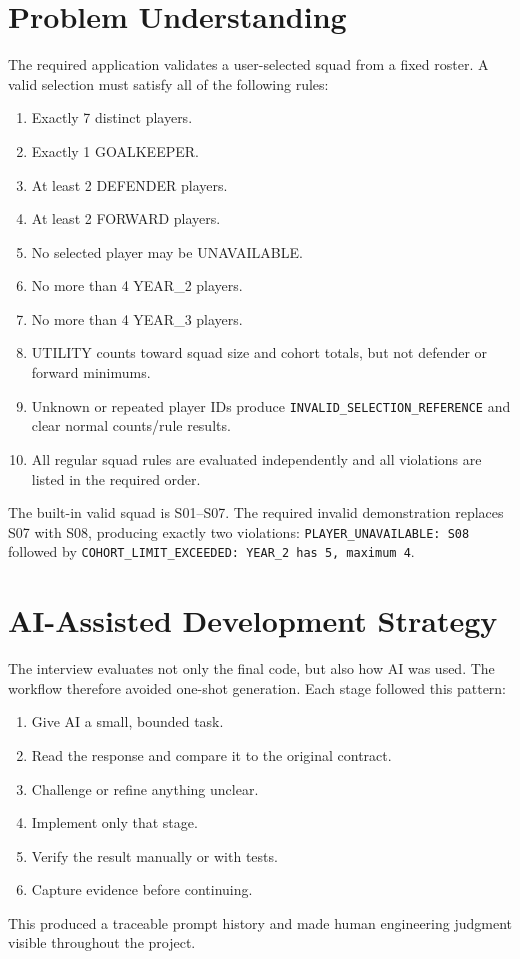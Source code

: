 \documentclass[11pt,a4paper]{article}
\begin{document}
\section{Problem Understanding}
The required application validates a user-selected squad from a fixed roster. A valid selection must satisfy all of the following rules:
\begin{enumerate}
\item Exactly 7 distinct players.
\item Exactly 1 GOALKEEPER.
\item At least 2 DEFENDER players.
\item At least 2 FORWARD players.
\item No selected player may be UNAVAILABLE.
\item No more than 4 YEAR\_2 players.
\item No more than 4 YEAR\_3 players.
\item UTILITY counts toward squad size and cohort totals, but not defender or forward minimums.
\item Unknown or repeated player IDs produce \texttt{INVALID\_SELECTION\_REFERENCE} and clear normal counts/rule results.
\item All regular squad rules are evaluated independently and all violations are listed in the required order.
\end{enumerate}

The built-in valid squad is S01--S07. The required invalid demonstration replaces S07 with S08, producing exactly two violations: \texttt{PLAYER\_UNAVAILABLE: S08} followed by \texttt{COHORT\_LIMIT\_EXCEEDED: YEAR\_2 has 5, maximum 4}.

\section{AI-Assisted Development Strategy}
The interview evaluates not only the final code, but also how AI was used. The workflow therefore avoided one-shot generation. Each stage followed this pattern:
\begin{enumerate}
\item Give AI a small, bounded task.
\item Read the response and compare it to the original contract.
\item Challenge or refine anything unclear.
\item Implement only that stage.
\item Verify the result manually or with tests.
\item Capture evidence before continuing.
\end{enumerate}
This produced a traceable prompt history and made human engineering judgment visible throughout the project.
\end{document}
